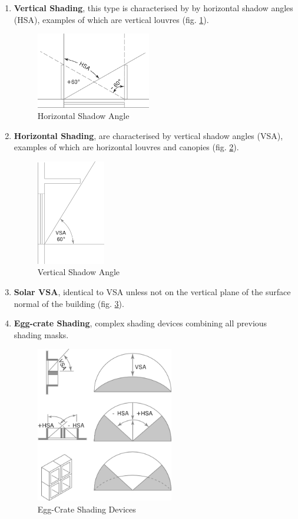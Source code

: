 \begin{enumerate}
  \item	\textbf{Vertical Shading}, this type is characterised by by horizontal shadow angles (HSA), examples of which are vertical louvres (fig. \ref{HSA}).
\begin{figure}[htbp]
\centering
\includegraphics[width=5cm]{./Images/5-HSA}
\caption[Horizontal Shadow Angle]{Horizontal Shadow Angle \cite{szokolay08}}
\label{HSA}
\end{figure}
  \item \textbf{Horizontal Shading}, are characterised by vertical shadow angles (VSA), examples of which are horizontal louvres and canopies (fig. \ref{VSA}).
\begin{figure}[htbp]
\centering
\includegraphics[width=3cm]{./Images/6-VSA}
\caption[Vertical Shadow Angle]{Vertical Shadow Angle \cite{szokolay08}}
\label{VSA}
\end{figure}
  \item \textbf{Solar VSA}, identical to VSA unless not on the vertical plane of the surface normal of the building (fig. \ref{EggCrate}).
  \item \textbf{Egg-crate Shading}, complex shading devices combining all previous shading masks.
\begin{figure}[htbp]
\centering
\includegraphics[width=6cm]{./Images/7-Egg-Crate}
\caption[Egg-Crate Shading Devices]{Egg-Crate Shading Devices \cite{szokolay08}}
\label{EggCrate}
\end{figure}
\end{enumerate}

